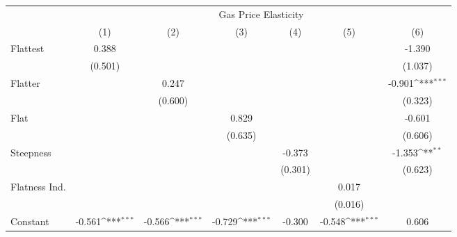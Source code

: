 {
\def\sym#1{\ifmmode^{#1}\else\(^{#1}\)\fi}
\begin{tabular}{l*{6}{c}}
\hline\hline
            &\multicolumn{6}{c}{Gas Price Elasticity}                                                                                           \\
            &\multicolumn{1}{c}{(1)}         &\multicolumn{1}{c}{(2)}         &\multicolumn{1}{c}{(3)}         &\multicolumn{1}{c}{(4)}         &\multicolumn{1}{c}{(5)}         &\multicolumn{1}{c}{(6)}         \\
\hline
Flattest    &       0.388         &                     &                     &                     &                     &      -1.390         \\
            &     (0.501)         &                     &                     &                     &                     &     (1.037)         \\
[1em]
Flatter     &                     &       0.247         &                     &                     &                     &      -0.901\sym{***}\\
            &                     &     (0.600)         &                     &                     &                     &     (0.323)         \\
[1em]
Flat        &                     &                     &       0.829         &                     &                     &      -0.601         \\
            &                     &                     &     (0.635)         &                     &                     &     (0.606)         \\
[1em]
Steepness   &                     &                     &                     &      -0.373         &                     &      -1.353\sym{**} \\
            &                     &                     &                     &     (0.301)         &                     &     (0.623)         \\
[1em]
Flatness Ind.&                     &                     &                     &                     &       0.017         &                     \\
            &                     &                     &                     &                     &     (0.016)         &                     \\
[1em]
Constant    &      -0.561\sym{***}&      -0.566\sym{***}&      -0.729\sym{***}&      -0.300         &      -0.548\sym{***}&       0.606         \\

\end{tabular}}
